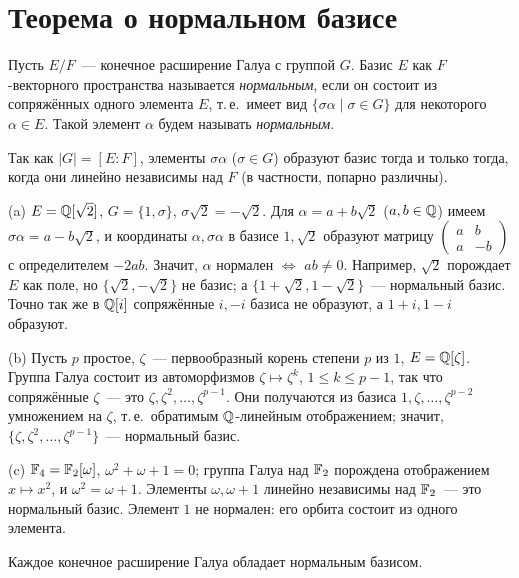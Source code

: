 \section{Теорема о нормальном базисе}

\begin{definition}[5.17]
Пусть $E/F$~--- конечное расширение Галуа с группой $G$. Базис $E$ как $F$-векторного пространства называется
\emph{нормальным}, если он состоит из сопряжённых одного элемента $E$, т.\,е.\ имеет вид $\{\sigma\alpha\mid\sigma\in G\}$
для некоторого $\alpha\in E$. Такой элемент $\alpha$ будем называть \emph{нормальным}.
\end{definition}

Так как $|G|=[E:F]$, элементы $\sigma\alpha$ ($\sigma\in G$) образуют базис тогда и только тогда, когда они линейно
независимы над $F$ (в частности, попарно различны).

\begin{example}[5.17a]
(a) $E=\mathbb Q[\sqrt2]$, $G=\{1,\sigma\}$, $\sigma\sqrt2=-\sqrt2$. Для $\alpha=a+b\sqrt2$ ($a,b\in\mathbb Q$) имеем
$\sigma\alpha=a-b\sqrt2$, и координаты $\alpha,\sigma\alpha$ в базисе $1,\sqrt2$ образуют матрицу
$\left(\begin{smallmatrix}a&b\\ a&-b\end{smallmatrix}\right)$ с определителем $-2ab$. Значит, $\alpha$ нормален $\iff$
$ab\ne0$. Например, $\sqrt2$ порождает $E$ как поле, но $\{\sqrt2,-\sqrt2\}$ не базис; а $\{1+\sqrt2,1-\sqrt2\}$~---
нормальный базис. Точно так же в $\mathbb Q[i]$ сопряжённые $i,-i$ базиса не образуют, а $1+i,1-i$ образуют.

(b) Пусть $p$ простое, $\zeta$~--- первообразный корень степени $p$ из $1$, $E=\mathbb Q[\zeta]$. Группа Галуа состоит из
автоморфизмов $\zeta\mapsto\zeta^k$, $1\le k\le p-1$, так что сопряжённые $\zeta$~--- это $\zeta,\zeta^2,\dots,\zeta^{p-1}$.
Они получаются из базиса $1,\zeta,\dots,\zeta^{p-2}$ умножением на $\zeta$, т.\,е.\ обратимым $\mathbb Q$-линейным
отображением; значит, $\{\zeta,\zeta^2,\dots,\zeta^{p-1}\}$~--- нормальный базис.

(c) $\mathbb F_4=\mathbb F_2[\omega]$, $\omega^2+\omega+1=0$; группа Галуа над $\mathbb F_2$ порождена отображением $x\mapsto x^2$, и
$\omega^2=\omega+1$. Элементы $\omega,\omega+1$ линейно независимы над $\mathbb F_2$~--- это нормальный базис. Элемент $1$ не
нормален: его орбита состоит из одного элемента.
\end{example}

\begin{theorem}
Каждое конечное расширение Галуа обладает нормальным базисом.
\end{theorem}

